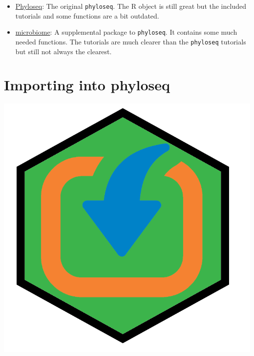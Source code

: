 \documentclass[
]{book}
\providecommand{\tightlist}{%
  \setlength{\itemsep}{0pt}\setlength{\parskip}{0pt}}
\begin{document}
\begin{itemize}
\tightlist
\item
  \href{https://joey711.github.io/phyloseq/}{Phyloseq}: The original \texttt{phyloseq}. The R object is still great but the included tutorials and some functions are a bit outdated.
\item
  \href{https://microbiome.github.io/tutorials/}{microbiome}: A supplemental package to \texttt{phyloseq}. It contains some much needed functions. The tutorials are much clearer than the \texttt{phyloseq} tutorials but still not always the clearest.
\end{itemize}

\hypertarget{importing-into-phyloseq}{%
\section{Importing into phyloseq}\label{importing-into-phyloseq}}

\includegraphics{figures/import.png}
\end{document}
